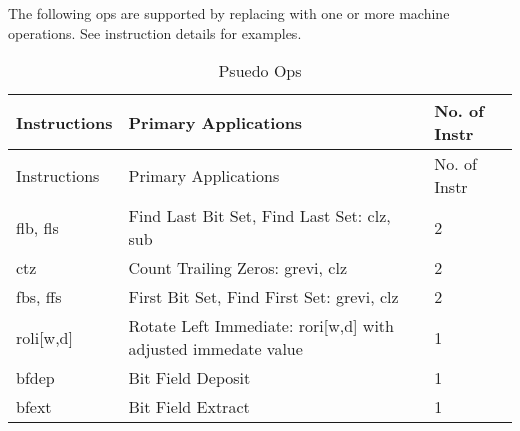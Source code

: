 The following ops are supported by replacing with one or more machine
operations. See instruction details for examples.

\begin{longtable}[c]{@{}lll@{}}
\caption{Psuedo Ops}\tabularnewline
\toprule
Instructions & Primary Applications & No. of Instr\tabularnewline
\midrule
\endfirsthead
\toprule
Instructions & Primary Applications & No. of Instr\tabularnewline
\midrule
\endhead
flb, fls      & Find Last Bit Set, Find Last Set: clz, sub                        & 2\tabularnewline
ctz           & Count Trailing Zeros: grevi, clz                                  & 2\tabularnewline
fbs, ffs      & First Bit Set, Find First Set: grevi, clz                         & 2\tabularnewline
roli[w,d]     & Rotate Left Immediate: rori[w,d] with adjusted immedate value     & 1\tabularnewline
bfdep         & Bit Field Deposit                                                 & 1\tabularnewline
bfext         & Bit Field Extract                                                 & 1\tabularnewline
\bottomrule
\end{longtable}
